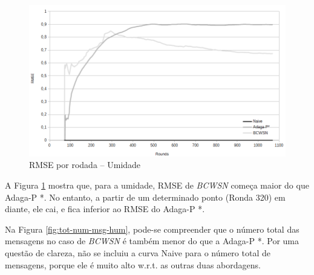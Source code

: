 \documentclass{acm_proc_article-sp}
\begin{document}
\begin{figure}[!htb]
\begin{center}
	\includegraphics[scale=0.28]{BCWSN-RMSExRound-BW-Hum.png}
	 \vspace*{-.6cm}
	 \caption{RMSE por rodada – Umidade}
    \label{fig:rmse-hum}
\end{center}
\end{figure}

A Figura \ref{fig:rmse-hum} mostra que, para a umidade, RMSE de {\it BCWSN} 
começa maior do que Adaga-P *. No entanto, a partir de um determinado ponto
(Ronda 320) em diante, ele cai, e fica inferior ao RMSE do Adaga-P *.
\vspace*{-.3cm}

Na Figura \ref{fig:tot-num-msg-hum}, pode-se compreender que o número total das mensagens no caso
de {\it BCWSN} é também menor do que a Adaga-P *. {Por uma questão de clareza,
não se incluiu a curva Naive para o número total de mensagens, porque ele
é muito alto w.r.t. as outras duas abordagens.}
\vspace*{-.3cm}
\end{document}
